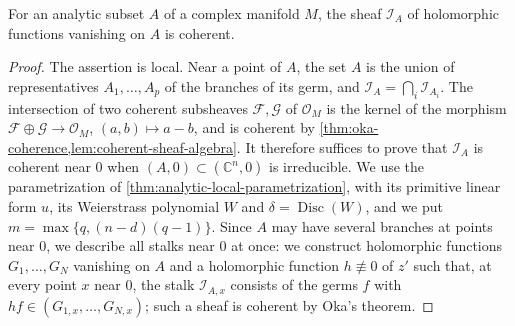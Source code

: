 \begin{theorem}\label{thm:analytic-ideal-coherence}
For an analytic subset $A$ of a complex manifold $M$, the sheaf $\mathcal I_A$ of holomorphic functions vanishing on $A$ is coherent.
\end{theorem}
\begin{proof}
The assertion is local. Near a point of $A$, the set $A$ is the union of representatives $A_1,\ldots,A_p$ of the branches of its germ, and $\mathcal I_A=\bigcap_i\mathcal I_{A_i}$. The intersection of two coherent subsheaves $\mathcal F,\mathcal G$ of $\mathcal O_M$ is the kernel of the morphism $\mathcal F\oplus\mathcal G\to\mathcal O_M$, $(a,b)\mapsto a-b$, and is coherent by \cref{thm:oka-coherence,lem:coherent-sheaf-algebra}. It therefore suffices to prove that $\mathcal I_A$ is coherent near $0$ when $(A,0)\subset(\mathbb C^n,0)$ is irreducible. We use the parametrization of \cref{thm:analytic-local-parametrization}, with its primitive linear form $u$, its Weierstrass polynomial $W$ and $\delta=\operatorname{Disc}(W)$, and we put $m=\max\{q,(n-d)(q-1)\}$. Since $A$ may have several branches at points near $0$, we describe all stalks near $0$ at once: we construct holomorphic functions $G_1,\ldots,G_N$ vanishing on $A$ and a holomorphic function $h\not\equiv0$ of $z'$ such that, at every point $x$ near $0$, the stalk $\mathcal I_{A,x}$ consists of the germs $f$ with $hf\in(G_{1,x},\ldots,G_{N,x})$; such a sheaf is coherent by Oka's theorem.


\end{proof}
